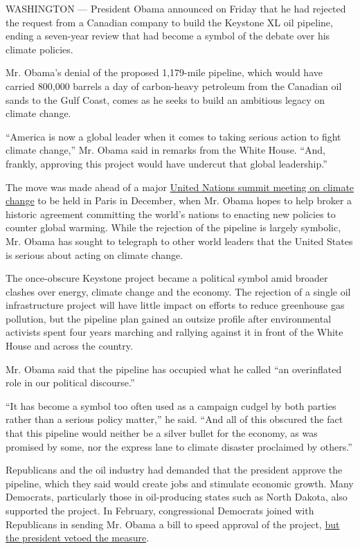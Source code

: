 WASHINGTON --- President Obama announced on Friday that he had rejected
the request from a Canadian company to build the Keystone XL oil
pipeline, ending a seven-year review that had become a symbol of the
debate over his climate policies.

Mr. Obama's denial of the proposed 1,179-mile pipeline, which would have
carried 800,000 barrels a day of carbon-heavy petroleum from the
Canadian oil sands to the Gulf Coast, comes as he seeks to build an
ambitious legacy on climate change.

``America is now a global leader when it comes to taking serious action
to fight climate change,'' Mr. Obama said in remarks from the White
House. ``And, frankly, approving this project would have undercut that
global leadership.''

The move was made ahead of a major
\href{http://www.nytimes.com/news-event/un-climate-change-conference}{United
Nations summit meeting on climate change} to be held in Paris in
December, when Mr. Obama hopes to help broker a historic agreement
committing the world's nations to enacting new policies to counter
global warming. While the rejection of the pipeline is largely symbolic,
Mr. Obama has sought to telegraph to other world leaders that the United
States is serious about acting on climate change.

The once-obscure Keystone project became a political symbol amid broader
clashes over energy, climate change and the economy. The rejection of a
single oil infrastructure project will have little impact on efforts to
reduce greenhouse gas pollution, but the pipeline plan gained an outsize
profile after environmental activists spent four years marching and
rallying against it in front of the White House and across the country.

Mr. Obama said that the pipeline has occupied what he called ``an
overinflated role in our political discourse.''

``It has become a symbol too often used as a campaign cudgel by both
parties rather than a serious policy matter,'' he said. ``And all of
this obscured the fact that this pipeline would neither be a silver
bullet for the economy, as was promised by some, nor the express lane to
climate disaster proclaimed by others.''

Republicans and the oil industry had demanded that the president approve
the pipeline, which they said would create jobs and stimulate economic
growth. Many Democrats, particularly those in oil-producing states such
as North Dakota, also supported the project. In February, congressional
Democrats joined with Republicans in sending Mr. Obama a bill to speed
approval of the project,
\href{http://www.nytimes.com/2015/02/25/us/politics/as-expected-obama-vetoes-keystone-xl-pipeline-bill.html}{but
the president vetoed the measure}.

